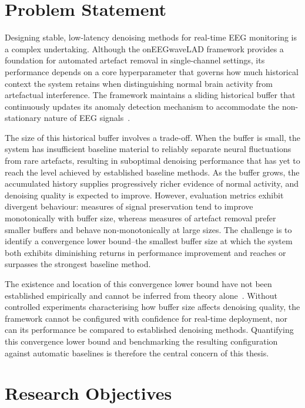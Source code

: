 \documentclass[MScCS,12pt,oneside,final]{uccthesis}
\begin{document}
    \section{Problem Statement}

Designing stable, low-latency denoising methods for real-time EEG monitoring is a complex undertaking. Although the onEEGwaveLAD framework provides a foundation for automated artefact removal in single-channel settings, its performance depends on a core hyperparameter that governs how much historical context the system retains when distinguishing normal brain activity from artefactual interference. The framework maintains a sliding historical buffer that continuously updates its anomaly detection mechanism to accommodate the non-stationary nature of EEG signals~\parencite{longo2025oneegwavelad}.

The size of this historical buffer involves a trade-off. When the buffer is small, the system has insufficient baseline material to reliably separate neural fluctuations from rare artefacts, resulting in suboptimal denoising performance that has yet to reach the level achieved by established baseline methods. As the buffer grows, the accumulated history supplies progressively richer evidence of normal activity, and denoising quality is expected to improve. However, evaluation metrics exhibit divergent behaviour: measures of signal preservation tend to improve monotonically with buffer size, whereas measures of artefact removal prefer smaller buffers and behave non-monotonically at large sizes. The challenge is to identify a convergence lower bound--the smallest buffer size at which the system both exhibits diminishing returns in performance improvement and reaches or surpasses the strongest baseline method.

The existence and location of this convergence lower bound have not been established empirically and cannot be inferred from theory alone~\parencite{longo2025oneegwavelad}. Without controlled experiments characterising how buffer size affects denoising quality, the framework cannot be configured with confidence for real-time deployment, nor can its performance be compared to established denoising methods. Quantifying this convergence lower bound and benchmarking the resulting configuration against automatic baselines is therefore the central concern of this thesis.

    \section{Research Objectives}
\end{document}
